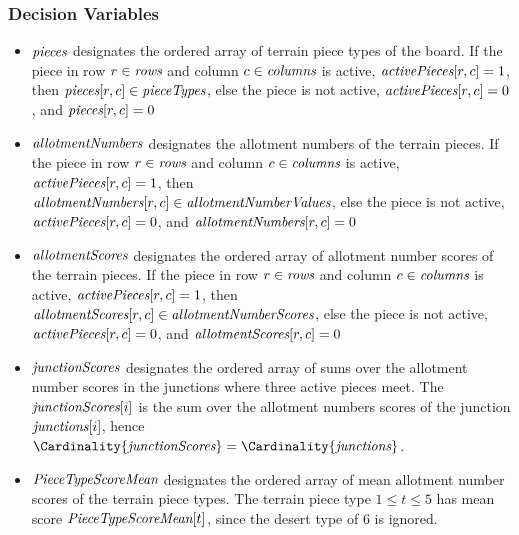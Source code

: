 \documentclass[a4paper,11pt]{article}
\begin{document}
\subsubsection{Decision Variables}
\begin{itemize}
\item $\textit{pieces}$ designates the ordered array of terrain piece types of the board. If the piece in row $r \in \textit{rows}$ and column $c \in \textit{columns}$ is active, $\textit{activePieces}[r,c]=1$, then $\textit{pieces}[r,c] \in \textit{pieceTypes}$, else the piece is not active, $\textit{activePieces}[r,c]=0$, and $\textit{pieces}[r,c] = 0$

\item $\textit{allotmentNumbers}$ designates the allotment numbers of the terrain pieces. If the piece in row $r \in \textit{rows}$ and column $c \in \textit{columns}$ is active, $\textit{activePieces}[r,c]=1$, then \\
$\textit{allotmentNumbers}[r,c] \in \textit{allotmentNumberValues}$, else the piece is not active, \\
$\textit{activePieces}[r,c]=0$, and $\textit{allotmentNumbers}[r,c] = 0$

\item $\textit{allotmentScores}$ designates the ordered array of allotment number scores of the terrain pieces. If the piece in row $r \in \textit{rows}$ and column $c \in \textit{columns}$ is active, $\textit{activePieces}[r,c]=1$, then $\textit{allotmentScores}[r,c] \in \textit{allotmentNumberScores}$, else the piece is not active,\\
$\textit{activePieces}[r,c]=0$, and $\textit{allotmentScores}[r,c] = 0$

\item $\textit{junctionScores}$ designates the ordered array of sums over the allotment number scores in the junctions where three active pieces meet. The $\textit{junctionScores}[i]$ is the sum over the allotment numbers scores of the junction $\textit{junctions}[i]$, hence $\Cardinality{\JunctionScores} = \Cardinality{\Junctions}$.

\item $\textit{PieceTypeScoreMean}$ designates the ordered array of mean allotment number scores of the terrain piece types. The terrain piece type $1 \leq t \leq 5$ has mean score $\textit{PieceTypeScoreMean}[t]$, since the desert type of $6$ is ignored.

\end{itemize}
\end{document}
